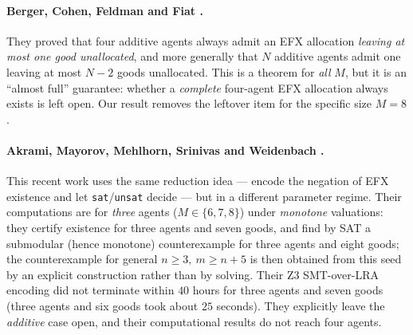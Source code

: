 \documentclass[11pt,a4paper]{article}
\theoremstyle{definition}
\theoremstyle{plain}
\newcommand{\EFX}{\textsf{EFX}}
\newcommand{\agents}{N}
\newcommand{\goods}{M}
\begin{document}
\paragraph{Berger, Cohen, Feldman and Fiat \cite{BergerCohenFeldmanFiat2022}.}
They proved that four additive agents always admit an \EFX{} allocation
\emph{leaving at most one good unallocated}, and more generally that $\agents$
additive agents admit one leaving at most $\agents-2$ goods unallocated. This is
a theorem for \emph{all} $\goods$, but it is an ``almost full'' guarantee:
whether a \emph{complete} four-agent \EFX{} allocation always exists is left
open. Our result removes the leftover item for the specific size $\goods=8$.

\paragraph{Akrami, Mayorov, Mehlhorn, Srinivas and Weidenbach \cite{AkramiEtAl2026}.}
This recent work uses the same reduction idea --- encode the negation of \EFX{}
existence and let \texttt{sat}/\texttt{unsat} decide --- but in a different
parameter regime. Their computations are for \emph{three} agents
($\goods\in\{6,7,8\}$) under \emph{monotone} valuations: they certify existence
for three agents and seven goods, and find by SAT a submodular (hence monotone)
counterexample for three agents and eight goods; the counterexample for general
$n\geq 3,\ m\geq n+5$ is then obtained from this seed by an explicit construction
rather than by solving. Their Z3 SMT-over-LRA encoding did not terminate within
$40$ hours for three agents and seven goods (three agents and six goods took about
$25$ seconds). They explicitly leave the \emph{additive} case open, and their
computational results do not reach four agents.
\end{document}
